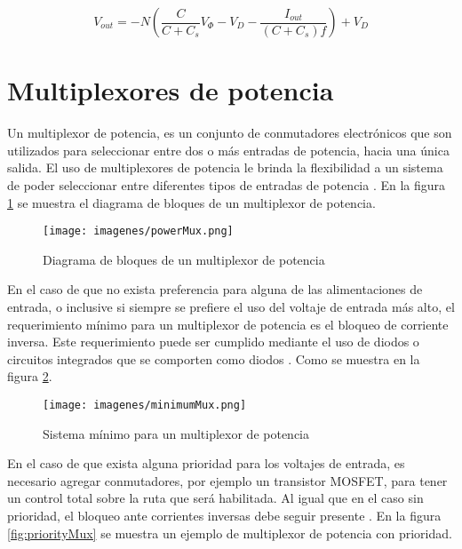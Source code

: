     \begin{equation}
        V_{out} = - N \left (  \frac{C}{C+C_s}V_\Phi - V_D - 
        \frac{I_{out}}{(C+C_s)f} \right ) + V_D
        \label{eq:dickson_charge_neg}
    \end{equation}


\section{Multiplexores de potencia}

Un multiplexor de potencia, es un conjunto de conmutadores electrónicos que son utilizados
para seleccionar entre dos o más entradas de potencia, hacia una única salida. El uso de 
multiplexores de potencia le brinda la flexibilidad a un sistema de poder seleccionar
entre diferentes tipos de entradas de potencia \cite{triano_basics_2020}. En la figura 
\ref{fig:powerMux} se muestra el diagrama de bloques de un multiplexor de potencia.


\begin{figure}[H]
    \centering
    \texttt{[image: imagenes/powerMux.png]}
    \caption{Diagrama de bloques de un multiplexor de potencia \cite{triano_basics_2020}}
    \label{fig:powerMux}
\end{figure}


En el caso de que no exista preferencia para alguna de las alimentaciones de entrada, o inclusive
si siempre se prefiere el uso del voltaje de entrada más alto, el requerimiento mínimo para un multiplexor
de potencia es el bloqueo de corriente inversa. Este requerimiento puede ser cumplido mediante el uso de 
diodos o circuitos integrados que se comporten como diodos \cite{triano_basics_2020}.  Como se muestra en la figura \ref{fig:muxDiode}.

\begin{figure}[H]
    \centering
    \texttt{[image: imagenes/minimumMux.png]}
    \caption{Sistema mínimo para un multiplexor de potencia \cite{triano_basics_2020}}
    \label{fig:muxDiode}
\end{figure}

En el caso de que exista alguna prioridad para los voltajes de entrada, es necesario agregar conmutadores,
por ejemplo un transistor MOSFET, para tener un control total sobre la ruta que será habilitada. Al igual que
en el caso sin prioridad, el bloqueo ante corrientes inversas debe seguir presente \cite{triano_basics_2020}. En la figura \ref{fig:priorityMux} se muestra un ejemplo de multiplexor de potencia con prioridad.

